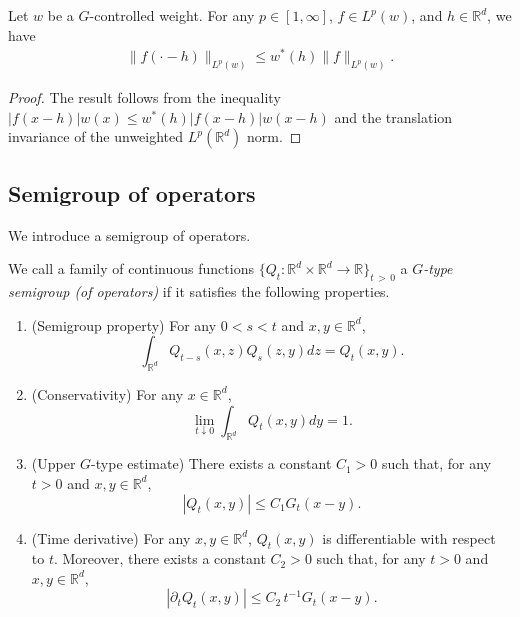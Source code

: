 \documentclass[AHL,Unicode,longabstracts,published]{cedram}
\newcommand{\bbR}{\mathbb{R}}
\newcommand{\wco}{w^*}
\newcommand*{\relabel}{\renewcommand{\labelenumi}{(\theenumi)}}
\newcommand*{\romanenumi}{\renewcommand*{\theenumi}{\roman{enumi}}\relabel}
\begin{document}
\begin{lemm}\label{lem:weightedtranslation}
Let $w$ be a $G$-controlled weight. For any $p\in[1,\infty]$, $f\in L^p(w)$, and $h\in\bbR^d$, we have
\begin{align*}
\|f(\cdot-h)\|_{L^p(w)}\le \wco(h)\|f\|_{L^p(w)}.
\end{align*}
\end{lemm}

\begin{proof}
The result follows from the inequality $|f(x-h)|w(x)\le \wco(h)|f(x-h)|w(x-h)$ and the translation invariance of the unweighted $L^p(\bbR^d)$ norm.
\end{proof}

\subsection{Semigroup of operators}

We introduce a semigroup of operators.

\begin{defi}\label{asmp1}
We call a family of continuous functions $\{Q_t:\bbR^d\times\bbR^d\to\bbR\}_{t\,>\,0}$ a \emph{$G$-type semigroup (of operators)} if it satisfies the following properties.
\begin{enumerate}\romanenumi
\item\label{asmp1:semigroup}
(Semigroup property) For any $0<s<t$ and $x,y\in\bbR^d$,
\[
\int_{\bbR^d}Q_{t-s}(x,z)Q_s(z,y)dz=Q_t(x,y).
\]
\item\label{asmp1:conservative}
(Conservativity) For any $x\in\bbR^d$,
\[
\lim_{t\downarrow0}\int_{\bbR^d}Q_t(x,y)dy=1.
\]
\item\label{asmp1:gauss}
(Upper $G$-type estimate) There exists a constant $C_1>0$ such that, for any $t>0$ and $x,y\in\bbR^d$,
\[
|Q_t(x,y)|\le C_1G_t(x-y).
\]
\item\label{asmp2:derivative}
(Time derivative) For any $x,y\in\bbR^d$, $Q_t(x,y)$ is differentiable with respect to $t$. Moreover, there exists a constant $C_2>0$ such that, for any $t>0$ and $x,y\in\bbR^d$,
\[
|\partial_tQ_t(x,y)|\le C_2\, t^{-1}G_t(x-y).
\]
\end{enumerate}
\end{defi}
\end{document}
